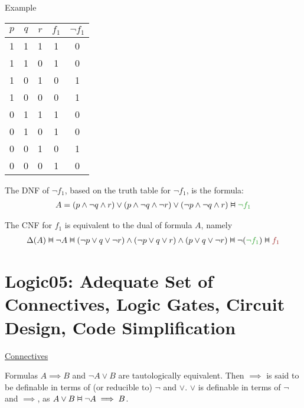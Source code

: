 \documentclass{article}
\newcommand{\vDashv}{%
  \mathrel{%
    \text{%
      \ooalign{$\vDash$\cr\reflectbox{$\vDash$}\cr}%
    }%
  }%
}
\begin{document}
Example



\begin{table}[h]
    \centering
    \begin{tabular}{|ccc|c|c|}\hline
        $p$ & $q$ & $r$ & \textcolor{reeed}{$f_1$} & \textcolor{mycolor}{$\neg f_1$}\\ \hline
         1&  1&  1&  1& {0}\\
         1&  1&  0&  1& {0}\\
         1&  0&  1&  0& {1}\\
         1&  0&  0&  0& {1}\\
         0&  1&  1&  1& {0}\\
         0&  1&  0&  1& {0}\\
         0&  0&  1&  0& {1}\\
         0&  0&  0&  1& {0}\\\hline
    \end{tabular}
\end{table}

The DNF of \textcolor{mycolor}{$\neg f_1$}, based on the truth table for \textcolor{mycolor}{$\neg f_1$}, is the formula:
\begin{align*}
    A = (p \wedge \neg q \wedge r) \vee (p \wedge \neg q \wedge \neg r) \vee (\neg p \wedge \neg q \wedge r) \vDashv \text{\textcolor{mycolor}{$\neg f_1$}}
\end{align*}

The CNF for $f_1$ is equivalent to the dual of formula $A$, namely
\begin{align*}
    \Delta(A) \vDashv \neg A \vDashv (\neg p \vee q \vee \neg r) \wedge (\neg p \vee q \vee r) \wedge (p \vee q \vee \neg r) \vDashv \neg (\text{\textcolor{mycolor}{$\neg f_1$}}) \vDashv \text{\textcolor{reeed}{$f_1$}}
\end{align*}


\section{Logic05: Adequate Set of Connectives, Logic Gates, Circuit Design, Code Simplification}

\underline{Connectives}

Formulas $A \implies B$ and $\neg A \vee B$ are tautologically equivalent. Then $\implies$ is said to be definable in terms of (or reducible to) $\neg$ and $\vee$. $\vee$ is definable in terms of $\neg$ and $\implies$, as $A \vee B \vDashv \neg A \implies B$.
\end{document}
